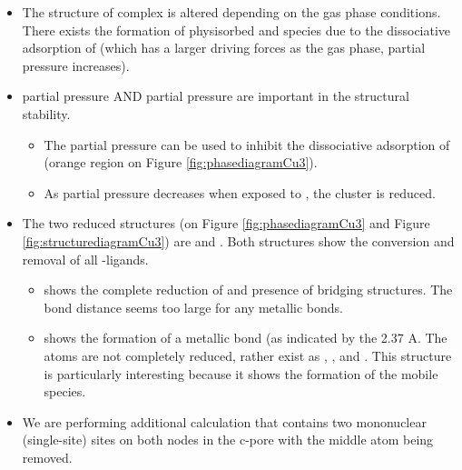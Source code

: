 \documentclass[journal=jctcce,manuscript=article]{achemso}
\begin{document}
\begin{itemize}
    \item The structure of  complex is altered depending on the gas phase conditions. There exists the formation of physisorbed  and  species due to the dissociative adsorption of  (which has a larger driving forces as the gas phase,  partial pressure increases). 
    \item {} partial pressure AND  partial pressure are important in the structural stability. 
    \begin{itemize}
        \item The  partial pressure can be used to inhibit the dissociative adsorption of  (orange region on Figure \ref{fig:phasediagramCu3}).
        \item As  partial pressure decreases when exposed to , the cluster is reduced.
    \end{itemize}
    \item The two reduced structures (on Figure \ref{fig:phasediagramCu3} and Figure \ref{fig:structurediagramCu3}) are  and . Both structures show the conversion and removal of all -ligands.
    \begin{itemize}
        \item {} shows the complete reduction of  and presence of  bridging structures. The bond distance seems too large for any  metallic bonds.  
        \item {} shows the formation of a metallic  bond (as indicated by the 2.37 A. The  atoms are not completely reduced, rather exist as , , and . This structure is particularly interesting because it shows the formation of the mobile  species. 
    \end{itemize}
    \item We are performing additional calculation that contains two mononuclear (single-site)  sites on both nodes in the c-pore with the middle  atom being removed. 
\end{itemize}

\newpage
\end{document}
